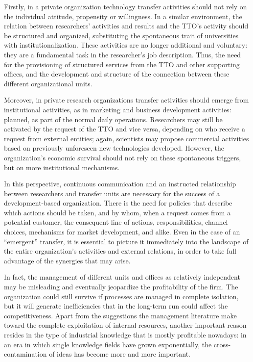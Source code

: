 Firstly, in a private organization technology transfer activities should not rely on the individual attitude, propensity or willingness. In a similar environment, the relation between researchers' activities and results and the TTO's activity should be structured and organized, substituting the spontaneous trait of universities with institutionalization. These activities are no longer additional and voluntary: they are a fundamental task in the researcher's job description. Thus, the need for the provisioning of structured services from the TTO and other supporting offices, and the development and structure of the connection between these different organizational units. 

Moreover, in private research organizations transfer activities should emerge from institutional activities, as in marketing and business development activities: planned, as part of the normal daily operations. Researchers may still be activated by the request of the TTO and vice versa, depending on who receive a request from external entities; again, scientists may propose commercial activities based on previously unforeseen new technologies developed. However, the organization's economic survival should not rely on these spontaneous triggers, but on more institutional mechanisms.

In this perspective, continuous communication and an instructed relationship between researchers and transfer units are necessary for the success of a development-based organization. There is the need for policies that describe which actions should be taken, and by whom, when a request comes from a potential customer, the consequent line of actions, responsibilities, channel choices, mechanisms for market development, and alike. Even in the case of an \enquote{emergent} transfer, it is essential to picture it immediately into the landscape of the entire organization's activities and external relations, in order to take full advantage of the synergies that may arise. 

In fact, the management of different units and offices as relatively independent may be misleading and eventually jeopardize the profitability of the firm. The organization could still survive if processes are managed in complete isolation, but it will generate inefficiencies that in the long-term run could affect the competitiveness. Apart from the suggestions the management literature make toward the complete exploitation of internal resources, another important reason resides in the type of industrial knowledge that is mostly profitable nowadays: in an era in which single knowledge fields have grown exponentially, the cross-contamination of ideas has become more and more important. 

